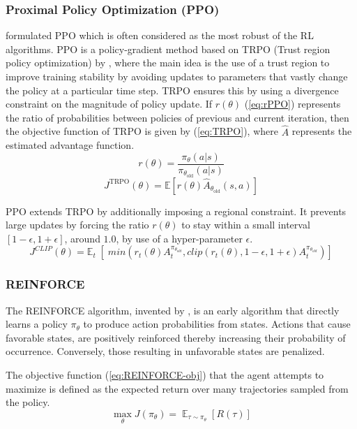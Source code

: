\documentclass[a4paper, 12pt]{article}
\begin{document}
\subsubsection*{Proximal Policy Optimization (PPO)} 
\cite{PPO-schulman2017} formulated PPO which is often considered as the most robust of the RL algorithms. PPO is a policy-gradient method based on TRPO (Trust region policy optimization) by \cite{TRPO-schulman2015}, where the main idea is the use of a trust region to improve training stability by avoiding updates to parameters that vastly change the policy at a particular time step. TRPO ensures this by using a divergence constraint on the magnitude of policy update. If $r(\theta)$ (\ref{eq:rPPO}) represents the ratio of probabilities between policies of previous and current iteration, then the objective function of TRPO is given by (\ref{eq:TRPO}), where $\hat{A}$ represents the estimated advantage function.
\begin{equation}\label{eq:rPPO}
	r(\theta) = \frac{\pi_\theta(a \vert s)}{\pi_{\theta_\text{old}}(a \vert s)}
\end{equation}
\begin{equation}\label{eq:TRPO}
	J^\text{TRPO} (\theta) = \mathbb{E} [ r(\theta) \hat{A}_{\theta_\text{old}}(s, a) ]
\end{equation}

PPO extends TRPO by additionally imposing a regional constraint. It prevents large updates by forcing the ratio $r(\theta)$ to stay within a small interval $[1-\epsilon, 1+\epsilon]$, around $1.0$, by use of a hyper-parameter $\epsilon$.
\begin{equation}
	J^{CLIP} (\theta) = \mathbb{E}_t \; [ \; min (r_t(\theta) A^{\pi_{\theta_{old}}}_t, clip(r_t(\theta), 1-\epsilon, 1+\epsilon) A^{\pi_{\theta_{old}}}_t)]
	\label{eq:PPO}
\end{equation}

\subsubsection*{REINFORCE} 
The REINFORCE algorithm, invented by \cite{REINFORCE-williams1992}, is an early algorithm that directly learns a policy $\pi_\theta$ to produce action probabilities from states. Actions that cause favorable states, are positively reinforced thereby increasing their probability of occurrence. Conversely, those resulting in unfavorable states are penalized.

The objective function (\ref{eq:REINFORCE-obj}) that the agent attempts to maximize is defined as the expected return over many trajectories sampled from the policy.
\begin{equation}\label{eq:REINFORCE-obj}
	\max_{\theta} J(\pi_{\theta}) = \mathop{\mathbb{E}}_{\tau \sim \pi_\theta} [R(\tau)]
\end{equation}
\end{document}
